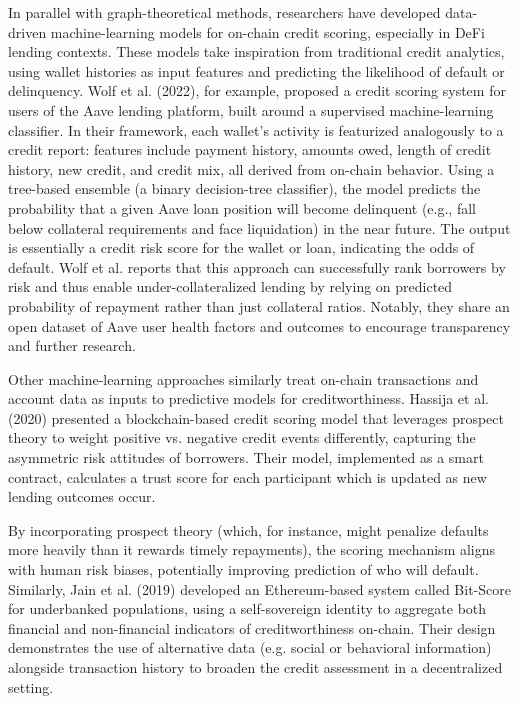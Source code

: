 \documentclass[12pt]{article}
\begin{document}
In parallel with graph-theoretical methods, researchers have developed data-driven machine-learning models for on-chain credit scoring, especially in DeFi lending contexts. These models take inspiration from traditional credit analytics, using wallet histories as input features and predicting the likelihood of default or delinquency. Wolf et al. (2022), for example, proposed a credit scoring system for users of the Aave lending platform, built around a supervised machine-learning classifier. In their framework, each wallet's activity is featurized analogously to a credit report: features include payment history, amounts owed, length of credit history, new credit, and credit mix, all derived from on-chain behavior. Using a tree-based ensemble (a binary decision-tree classifier), the model predicts the probability that a given Aave loan position will become delinquent (e.g., fall below collateral requirements and face liquidation) in the near future. The output is essentially a credit risk score for the wallet or loan, indicating the odds of default. Wolf et al. reports that this approach can successfully rank borrowers by risk and thus enable under-collateralized lending by relying on predicted probability of repayment rather than just collateral ratios. Notably, they share an open dataset of Aave user health factors and outcomes to encourage transparency and further research.


Other machine-learning approaches similarly treat on-chain transactions and account data as inputs to predictive models for creditworthiness. Hassija et al. (2020) presented a blockchain-based credit scoring model that leverages prospect theory to weight positive vs. negative credit events differently, capturing the asymmetric risk attitudes of borrowers. Their model, implemented as a smart contract, calculates a trust score for each participant which is updated as new lending outcomes occur.


By incorporating prospect theory (which, for instance, might penalize defaults more heavily than it rewards timely repayments), the scoring mechanism aligns with human risk biases, potentially improving prediction of who will default. Similarly, Jain et al. (2019) developed an Ethereum-based system called Bit-Score for underbanked populations, using a self-sovereign identity to aggregate both financial and non-financial indicators of creditworthiness on-chain. Their design demonstrates the use of alternative data (e.g. social or behavioral information) alongside transaction history to broaden the credit assessment in a decentralized setting.
\end{document}
